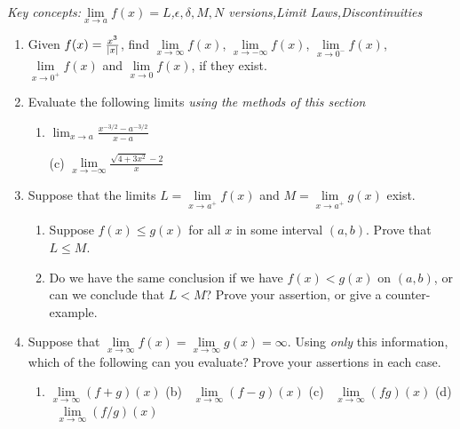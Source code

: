 \begin{exercises}
	\emph{Key concepts:\quad $\lim\limits_{x\to a}f(x)=L$,\quad $\epsilon,\delta,M,N$  versions,\quad Limit Laws,\quad Discontinuities}


	
	\begin{enumerate}\itemsep0pt%
	  \item Given $f(x)=\frac{x^3}{\left| x\right|}$, find $\lim\limits_{x\to\infty}f(x)$, $\lim\limits_{x\to-\infty}f(x)$, $\lim\limits_{x\to 0^-}f(x)$, $\lim\limits_{x\to 0^+}f(x)$ and $\lim\limits_{x\to 0}f(x)$, if they exist.
	  
	  \item Evaluate the following limits \emph{using the methods of this section}
	  \begin{enumerate}
	    \item {}
	    \space$\displaystyle\lim_{x\to a}\frac{x^{-3/2}-a^{-3/2}}{x-a}$
	    \item[(c)] 
	    \space $\displaystyle\lim\limits_{x\to -\infty}\frac{\sqrt{4+3x^2}-2}{x}$
	  \end{enumerate}
	  
	  
	  \item Suppose that the limits $L=\lim\limits_{x\to a^+}f(x)$ and $M=\lim\limits_{x\to a^+}g(x)$ exist.
	  \begin{enumerate}
	    \item Suppose $f(x)\le g(x)$ for all $x$ in some interval $(a,b)$. Prove that $L\le M$.
	    \item Do we have the same conclusion if we have $f(x)<g(x)$ on $(a,b)$, or can we conclude that $L<M$? Prove your assertion, or give a counter-example.
	  \end{enumerate}
	  
	  
	  \item Suppose that $\lim\limits_{x\to\infty}f(x)=\lim\limits_{x\to\infty}g(x)=\infty$. Using \emph{only} this information, which of the following can you evaluate? Prove your assertions in each case.
	  \begin{enumerate}
	    \item $\lim\limits_{x\to\infty}(f+g)(x)$\qquad
			(b) \ $\lim\limits_{x\to\infty}(f-g)(x)$\qquad
			(c) \ $\lim\limits_{x\to\infty}(fg)(x)$\qquad
			(d) \ $\lim\limits_{x\to\infty}(f/g)(x)$
	  \end{enumerate}
	  

\end{enumerate}
\end{exercises}
